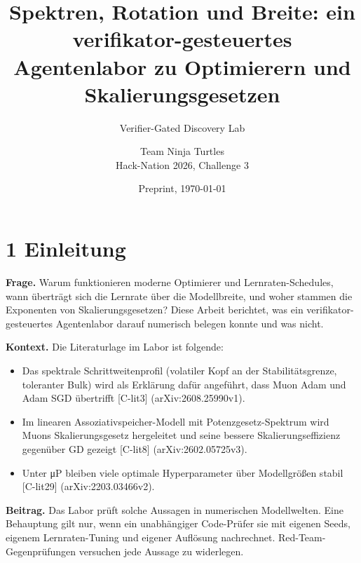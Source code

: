 \documentclass[10pt,twocolumn]{article}
\title{\textbf{Spektren, Rotation und Breite: ein verifikator-gesteuertes Agentenlabor zu Optimierern und Skalierungsgesetzen}}
\author{Verifier-Gated Discovery Lab \and Team Ninja Turtles\\ \small Hack-Nation 2026, Challenge 3}
\date{Preprint, \today}
\begin{document}
\maketitle
\section{1 Einleitung}

\textbf{Frage.} Warum funktionieren moderne Optimierer und Lernraten-Schedules, wann überträgt sich die Lernrate über die Modellbreite, und woher stammen die Exponenten von Skalierungsgesetzen? Diese Arbeit berichtet, was ein verifikator-gesteuertes Agentenlabor darauf numerisch belegen konnte und was nicht.

\textbf{Kontext.} Die Literaturlage im Labor ist folgende:
\begin{itemize}
\item Das spektrale Schrittweitenprofil (volatiler Kopf an der Stabilitätsgrenze, toleranter Bulk) wird als Erklärung dafür angeführt, dass Muon Adam und Adam SGD übertrifft {\scriptsize[C-lit3]} (arXiv:2608.25990v1).
\item Im linearen Assoziativspeicher-Modell mit Potenzgesetz-Spektrum wird Muons Skalierungsgesetz hergeleitet und seine bessere Skalierungseffizienz gegenüber GD gezeigt {\scriptsize[C-lit8]} (arXiv:2602.05725v3).
\item Unter μP bleiben viele optimale Hyperparameter über Modellgrößen stabil {\scriptsize[C-lit29]} (arXiv:2203.03466v2).
\end{itemize}

\textbf{Beitrag.} Das Labor prüft solche Aussagen in numerischen Modellwelten. Eine Behauptung gilt nur, wenn ein unabhängiger Code-Prüfer sie mit eigenen Seeds, eigenem Lernraten-Tuning und eigener Auflösung nachrechnet. Red-Team-Gegenprüfungen versuchen jede Aussage zu widerlegen.
\end{document}
